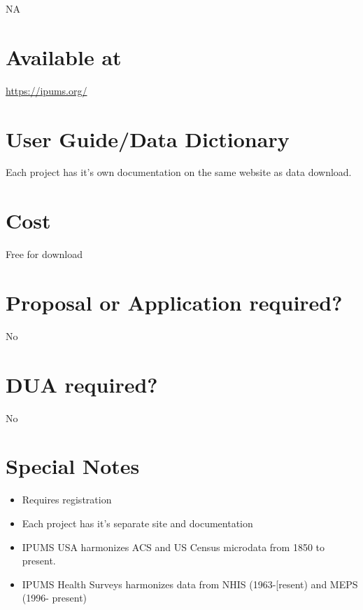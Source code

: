 \documentclass[
]{book}
\providecommand{\tightlist}{%
  \setlength{\itemsep}{0pt}\setlength{\parskip}{0pt}}
\begin{document}
NA

\hypertarget{available-at-34}{%
\section{Available at}\label{available-at-34}}

\url{https://ipums.org/}

\hypertarget{user-guidedata-dictionary-34}{%
\section{User Guide/Data Dictionary}\label{user-guidedata-dictionary-34}}

Each project has it's own documentation on the same website as data download.

\hypertarget{cost-34}{%
\section{Cost}\label{cost-34}}

Free for download

\hypertarget{proposal-or-application-required-34}{%
\section{Proposal or Application required?}\label{proposal-or-application-required-34}}

No

\hypertarget{dua-required-34}{%
\section{DUA required?}\label{dua-required-34}}

No

\hypertarget{special-notes-34}{%
\section{Special Notes}\label{special-notes-34}}

\begin{itemize}
\tightlist
\item
  Requires registration
\item
  Each project has it's separate site and documentation
\item
  IPUMS USA harmonizes ACS and US Census microdata from 1850 to present.
\item
  IPUMS Health Surveys harmonizes data from NHIS (1963-{[}resent) and MEPS (1996- present)
\end{itemize}
\end{document}
